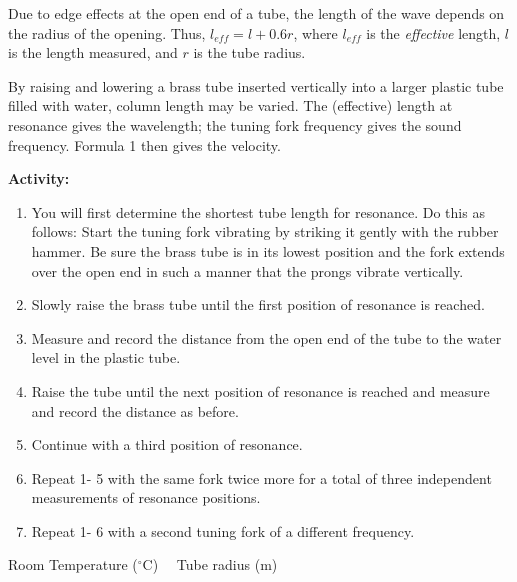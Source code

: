  Due to edge effects at the open end of a tube, the length of the wave depends on the radius of the opening. Thus, $l_{eff} = l + 0.6r$, where $l_{eff}$ is the \textit{effective} length, $l$ is the length measured, and $r$ is the tube radius.

\noindent By raising and lowering a brass tube inserted vertically into a larger plastic tube filled with water, column length may be varied. The (effective) length at resonance gives the wavelength; the tuning fork frequency gives the sound frequency. Formula 1 then gives the velocity. 

\bigskip
{\noindent \bf Activity:} \begin{enumerate}

\item You will first determine the shortest tube length for resonance. Do this as follows: Start the tuning fork vibrating by striking it gently with the rubber hammer. Be sure the brass tube is in its lowest position and the fork extends over the open end in such a manner that the prongs vibrate vertically.

\item Slowly raise the brass tube until the first position of resonance is reached.

\item Measure and record the distance from the open end of the tube to the water level in the plastic tube.

\item Raise the tube until the next position of resonance is reached and measure and record the distance as before.

\item Continue with a third position of resonance.

\item Repeat 1- 5 with the same fork twice more for a total of three independent measurements of resonance positions.

\item Repeat 1- 6 with a second tuning fork of a different frequency.

\end{enumerate}

\vskip35pt


\medskip
\noindent Room Temperature ($^\circ$C) \hrulefill \ \  Tube radius (m) \hrulefill

